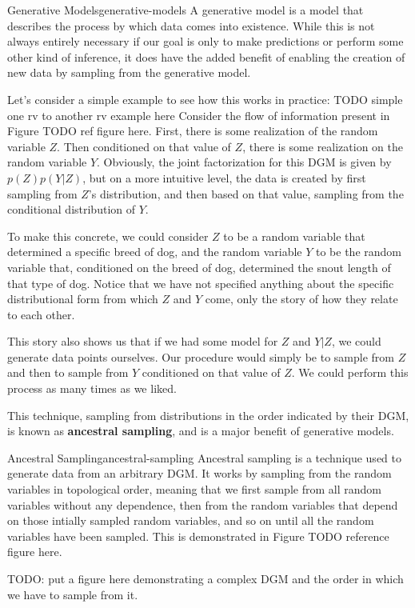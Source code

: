 \begin{definition}{Generative Models}{generative-models}
    A generative model is a model that describes the process by which data comes into existence. While this is not always entirely necessary if our goal is only to make predictions or perform some other kind of inference, it does have the added benefit of enabling the creation of new data by sampling from the generative model.
\end{definition}

Let's consider a simple example to see how this works in practice:
TODO simple one rv to another rv example here
Consider the flow of information present in Figure TODO ref figure here. First, there is some realization of the random variable $Z$. Then conditioned on that value of $Z$, there is some realization on the random variable $Y$. Obviously, the joint factorization for this DGM is given by $p(Z)p(Y|Z)$, but on a more intuitive level, the data is created by first sampling from $Z$'s distribution, and then based on that value, sampling from the conditional distribution of $Y$.

To make this concrete, we could consider $Z$ to be a random variable that determined a specific breed of dog, and the random variable $Y$ to be the random variable that, conditioned on the breed of dog, determined the snout length of that type of dog. Notice that we have not specified anything about the specific distributional form from which $Z$ and $Y$ come, only the story of how they relate to each other.

This story also shows us that if we had some model for $Z$ and $Y|Z$, we could generate data points ourselves. Our procedure would simply be to sample from $Z$ and then to sample from $Y$ conditioned on that value of $Z$. We could perform this process as many times as we liked.

This technique, sampling from distributions in the order indicated by their DGM, is known as \textbf{ancestral sampling}, and is a major benefit of generative models.

\begin{definition}{Ancestral Sampling}{ancestral-sampling}
	Ancestral sampling is a technique used to generate data from an arbitrary DGM. It works by sampling from the random variables in topological order, meaning that we first sample from all random variables without any dependence, then from the random variables that depend on those intially sampled random variables, and so on until all the random variables have been sampled. This is demonstrated in Figure TODO reference figure here.

	TODO: put a figure here demonstrating a complex DGM and the order in which we have to sample from it.
\end{definition}

